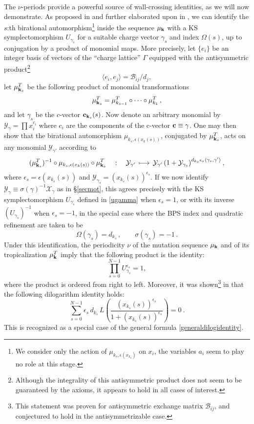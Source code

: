 \documentclass[12pt,reqno]{article}
\numberwithin{equation}{section}
\newcommand{\be}{\begin{equation}}
\newcommand{\ee}{\end{equation}}
\newcommand{\cX}{\mathcal{X}}
\newcommand{\cY}{\mathcal{Y}}
\newcommand{\bfk}{{\bf k}}
\newcommand{\exm}{\mathcal{B}}
\def\ind{s}
\numberwithin{equation}{section}
\begin{document}
The $\nu$-periods provide a powerful source of  wall-crossing identities,
as we will now demonstrate. As proposed in \cite{ks} and further elaborated upon
in \cite{Gaiotto:2009hg,Gaiotto:2010be}, we can identify the
$s$:th birational automorphism\footnote{We consider only the action of  $\mu_{k_s,\epsilon(x_{k_s})}$ on
$x_i$, the variables $a_i$ seem to play no role at this stage.}
 inside the sequence $\mu_{\bfk}$
with a KS symplectomorphism $U_{\gamma_\ind}$
for a suitable charge vector $\gamma_\ind$
and index $\Omega(\ind)$, up to conjugation
by a product of monomial maps.
More precisely, let $\{e_i\}$ be an integer basis of vectors  of the ``charge lattice''
$\Gamma$ equipped with the antisymmetric product\footnote{Although the integrality
of this antisymmetric product does not seem to be guaranteed by the axioms, it appears
to hold in all cases of interest.}
\be
\langle e_i, e_j \rangle =  \exm_{ij} /d_j ,
\ee
let $\mu^T_{{\bfk}_\ind}$ be the following product of monomial transformations
\be
\mu^T_{{\bfk}_\ind}= \mu^T_{k_{\ind-1}}\circ\dots\circ \mu^T_{k_1}\, ,
\ee
and let $\gamma_\ind$ be the $c$-vector ${\bf c}_{{\bfk}_\ind}(\ind)$.
Now denote an arbitrary monomial by $\cY_{\gamma} = \prod x_i^{c_i}$
where $c_i$ are the components of the c-vector ${\bf c}\equiv \gamma$.
One may then show that
the birational automorphism $\mu_{k_s,\epsilon(x_k(s))}$, conjugated
by $\mu^T_{{\bfk}_\ind}$, acts on any monomial $\cY_{\gamma'}$ according to
\be
(\mu^T_{{\bfk}_\ind})^{-1}\circ \mu_{k_\ind,\epsilon(x_k(\ind))}
\circ \mu^T_{{\bfk}_\ind}\quad :\quad
\cY_{\gamma'}\,  \longmapsto\,
\cY_{\gamma'} \left(1+ \cY_{\gamma_\ind}\right)^{ d_{k_\ind}
\epsilon_\ind\langle \gamma_\ind, \gamma' \rangle},
\ee
where $\epsilon_\ind=\epsilon(x_{k_\ind}(\ind))$ and
$\cY_{\gamma_\ind}=(x_{k_\ind}(\ind))^{\epsilon_\ind}$.
If we now identify $\cY_\gamma \equiv \sigma(\gamma)^{-1} \cX_\gamma$ as in \S\ref{secmot},
this agrees precisely with the KS symplectomorphism $U_{\gamma_\ind}$
defined in \eqref{ugamma} when $\epsilon_s=1$, or with its inverse $(U_{\gamma_\ind})^{-1}$
when $\epsilon_\ind=-1$, in the special case where the BPS index  and quadratic refinement
are taken to be
\be
\Omega(\gamma_\ind)=d_{k_\ind}\, ,
\qquad
\sigma(\gamma_\ind)=-1\, .
\ee
Under this identification, the periodicity $\nu$ of the mutation sequence
$\mu_{\bf k}$ and of its tropicalization $\mu^T_{\bf k}$ imply that
the following product is the identity:
\be
\label{cluspro}
\prod_{\ind=0}^{N-1} U^{\epsilon_\ind}_{\gamma_\ind} = 1 ,
\ee
where the product is ordered
from right to left. Moreover, it was shown\footnote{This statement
was proven for antisymmetric exchange matrix $ \exm_{ij} $, and conjectured to hold
in the antisymmetrizable case.}  in \cite{Nakanishi:2010} that
the following dilogarithm identity holds:
\be
\label{naka}
\sum_{\ind=0}^{N-1}\epsilon_\ind\, d_{k_\ind}\, L\left( \frac{(x_{k_\ind}(\ind))^{\epsilon_\ind}}
{1+(x_{k_\ind}(\ind))^{\epsilon_\ind}}\right) =0\ .
\ee
This is recognized as a special case of the general formula \eqref{generaldilogidentity}.
\end{document}
